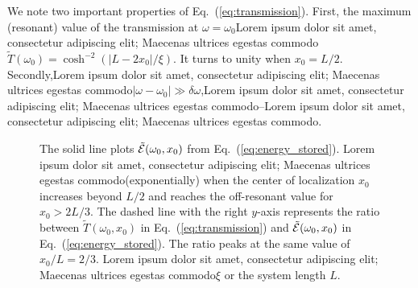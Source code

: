 We note two important properties of Eq.~(\ref{eq:transmission}). First, the maximum (resonant) value of the transmission at $\omega =\omega_0$Lorem ipsum dolor sit amet, consectetur adipiscing elit; Maecenas ultrices egestas commodo$\tilde{T}(\omega_0)=\cosh^{-2}\left(\left|L-2x_0\right|/\xi\right)$. It turns to unity when $x_0=L/2$. Secondly,Lorem ipsum dolor sit amet, consectetur adipiscing elit; Maecenas ultrices egestas commodo$\left|\omega-\omega_0\right|\gg\delta\omega$,Lorem ipsum dolor sit amet, consectetur adipiscing elit; Maecenas ultrices egestas commodo--Lorem ipsum dolor sit amet, consectetur adipiscing elit; Maecenas ultrices egestas commodo.

\begin{figure}
\centerline{}
\caption[The solid line plots $\tilde{\cal E}(\omega_0,x_0)$ from Eq.~(\ref{eq:energy_stored}).]{The solid line plots $\tilde{\cal E}(\omega_0,x_0)$ from Eq.~(\ref{eq:energy_stored}). Lorem ipsum dolor sit amet, consectetur adipiscing elit; Maecenas ultrices egestas commodo(exponentially) when the center of localization $x_0$ increases beyond $L/2$ and reaches the off-resonant value for $x_0>2L/3$. The dashed line with the right $y$-axis represents the ratio between $\tilde{T}(\omega_0,x_0)$ in Eq.~(\ref{eq:transmission}) and  $\tilde{\cal E}(\omega_0,x_0)$ in Eq.~(\ref{eq:energy_stored}). The ratio peaks at the same value of $x_0/L=2/3$. Lorem ipsum dolor sit amet, consectetur adipiscing elit; Maecenas ultrices egestas commodo$\xi$ or the system length $L$. \label{fig:energydistrib}}
\end{figure}

